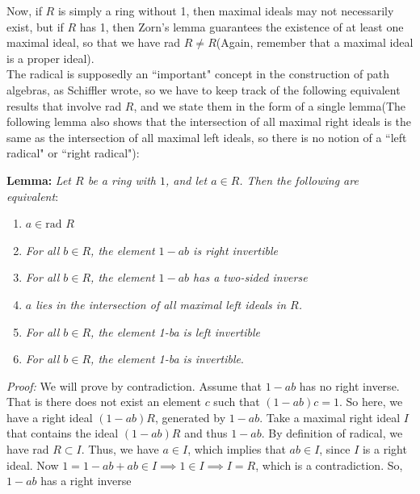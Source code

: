 \documentclass[12pt]{article}
\begin{document}
 Now, if $R$ is simply a ring without 1, then maximal ideals may not necessarily exist, but if $R$ has 1, then Zorn's lemma guarantees the existence of at least one maximal ideal, so that we have rad $R \neq R$(Again, remember that a maximal ideal is a proper ideal).\\

 The radical is supposedly an ``important" concept in the construction  of path algebras, as Schiffler wrote, so we have to keep track of the following equivalent results that involve rad $R$, and we state them in the form of a single lemma(The following lemma also shows that the intersection of all maximal right ideals is the same as the intersection of all maximal left ideals, so there is no notion of a ``left radical" or ``right radical"): 

\textbf{Lemma: } \textit{Let $R$ be a ring with $1$, and let $a \in R$. Then the following are equivalent}: 

\begin{enumerate}
    \item $a\in \text{rad }R$
    \item \textit{For all $b \in R$, the element $1-ab$ is right invertible}
    \item \textit{For all $b \in R$, the element $1-ab$ has a two-sided inverse }
    \item \textit{$a$ lies in the intersection of all maximal left ideals in $R$.}
    \item \textit{For all $b \in R$, the element 1-ba is left invertible}
    \item \textit{For all $b \in R$, the element 1-ba is invertible}.
\end{enumerate}
\newpage
\textit{Proof: } We will prove by contradiction. Assume that $1-ab$ has no right inverse. That is there does not exist an element $c$ such that $(1-ab)c=1$. So here, we have a right ideal $(1-ab)R$, generated by $1-ab$. Take a maximal right ideal $I$ that contains the ideal $(1-ab)R$ and thus $1-ab$. By definition of radical, we have rad $R \subset I$. Thus, we have $a\in I$, which implies that $ab\in I$, since $I$ is a right ideal. Now $1=1-ab+ab \in I \implies 1 \in I\implies I=R$, which is a contradiction. So, $1-ab$ has a right inverse

 
 
 
\end{document}
